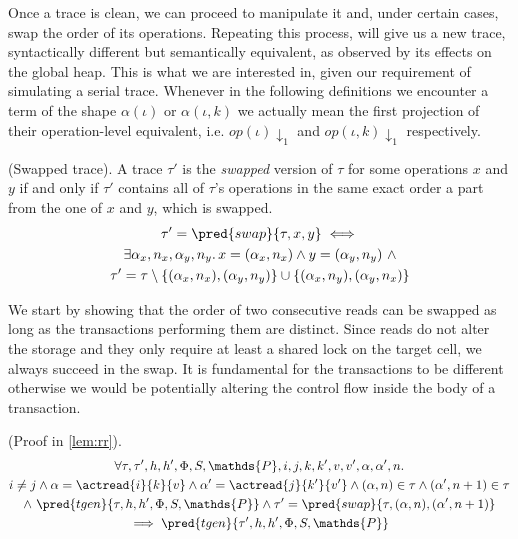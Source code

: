 Once a trace is clean, we can proceed to manipulate it and, under certain cases, swap the order of its operations. Repeating this process, will give us a new trace, syntactically different but semantically equivalent, as observed by its effects on the global heap. This is what we are interested in, given our requirement of simulating a serial trace. Whenever in the following definitions we encounter a term of the shape $\alpha(\iota)$ or $\alpha(\iota, k)$ we actually mean the first projection of their operation-level equivalent, i.e. $op(\iota) \downarrow_1$ and $op(\iota, k) \downarrow_1$ respectively.

\begin{defn}
	(Swapped trace).
	A trace $\tau'$ is the \emph{swapped} version of $\tau$ for some operations $x$ and $y$ if and only if $\tau'$ contains all of $\tau$'s operations in the same exact order a part from the one of $x$ and $y$, which is swapped.
	\begin{gather*}
		\tau' = \pred{swap}{\tau, x, y}
		\iff \\
		\exists \alpha_x, n_x, \alpha_y, n_y \ldotp x = (\alpha_x, n_x) \land y = (\alpha_y, n_y)\ \land \\
		\tau' = \tau \setminus \{(\alpha_x, n_x), (\alpha_y, n_y)\} \cup \{ (\alpha_x, n_y), (\alpha_y, n_x) \}
	\end{gather*}
\end{defn}

We start by showing that the order of two consecutive reads can be swapped as long as the transactions performing them are distinct. Since reads do not alter the storage and they only require at least a shared lock on the target cell, we always succeed in the swap. It is fundamental for the transactions to be different otherwise we would be potentially altering the control flow inside the body of a transaction.
\begin{lem}
	(Proof in \ref{lem:rr}).
	\begin{gather*}
		\forall \tau, \tau', h, h', \Phi, S, \mathds{P}, i, j, k, k', v, v', \alpha, \alpha', n \ldotp \\
		i \neq j \land \alpha = \actread{i}{k}{v} \land \alpha' = \actread{j}{k'}{v'} \land (\alpha, n) \in \tau \land (\alpha', n+1) \in \tau \\ \land\ \pred{tgen}{\tau, h, h', \Phi, S, \mathds{P}} \land \tau' = \pred{swap}{\tau, (\alpha, n), (\alpha', n+1)}
			\\	 
		 \implies \pred{tgen}{\tau', h, h', \Phi, S, \mathds{P}}
	\end{gather*}
\end{lem}

